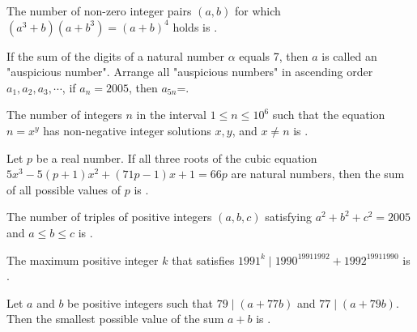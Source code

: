\begin{problem}\label{Alg29}
The number of non-zero integer pairs $(a,b)$ for which $\left(a^3+b\right)\left(a+b^3\right)=(a+b)^4$ holds is \underline{\hspace{2cm}}.	
\end{problem}



\begin{problem}\label{Alg30}
If the sum of the digits of a natural number $\alpha$ equals 7, then $a$ is called an "auspicious number". Arrange all "auspicious numbers" in ascending order $a_1,a_2,a_3,\cdots$, if $a_n=2005$, then $a_{5n}$=\underline{\hspace{2cm}}.	
\end{problem}


\begin{problem}\label{Alg31}
The number of integers $n$ in the interval $1\leq n\leq10^6$ such that the equation $n=x^y$ has non-negative integer solutions $x,y$, and $x\neq n$ is \underline{\hspace{2cm}}.
\end{problem}


\begin{problem}\label{Alg32}
Let $p$ be a real number. If all three roots of the cubic equation $5x^3 - 5(p+1)x^2 + (71p - 1)x + 1 = 66p$ are natural numbers, then the sum of all possible values of $p$ is \underline{\hspace{2cm}}.	
\end{problem}


\begin{problem}\label{Alg33}
The number of triples of positive integers $(a, b, c)$ satisfying $a^2 + b^2 + c^2 = 2005$ and $a \leq b \leq c$ is \underline{\hspace{2cm}}.	
\end{problem}


\begin{problem}\label{Alg34}
The maximum positive integer $k$ that satisfies $1991^k \mid 1990^{19911992} + 1992^{19911990}$ is \underline{\hspace{2cm}}.	
\end{problem}



\begin{problem}\label{Alg35}
Let $a$ and $b$ be positive integers such that $79 \mid (a + 77b)$ and $77 \mid (a + 79b)$. Then the smallest possible value of the sum $a + b$ is \underline{\hspace{2cm}}.	
\end{problem}


